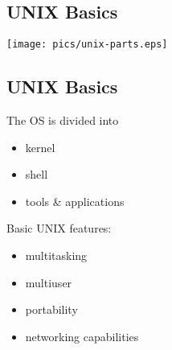 \documentclass[xga]{xdvislides}
\begin{document}
%

\subsection{UNIX Basics}
\vspace*{\fill}
\begin{center}
	\texttt{[image: pics/unix-parts.eps]} \\
\end{center}
\vspace*{\fill}


\subsection{UNIX Basics}
The OS is divided into
\begin{itemize}
	\item kernel
	\item shell
	\item tools \& applications
\end{itemize}
\addvspace{.5in}
Basic UNIX features:
\begin{itemize}
	\item multitasking
	\item multiuser
	\item portability
	\item networking capabilities
\end{itemize}
\end{document}
